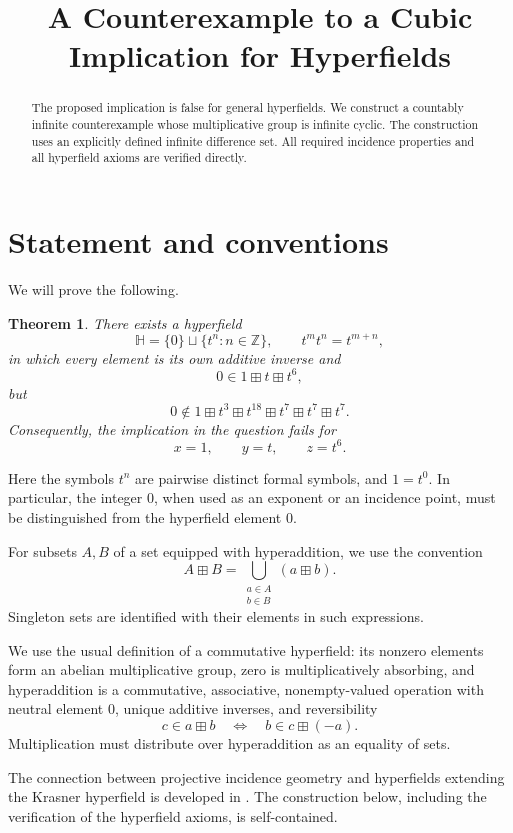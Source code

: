 \documentclass[11pt]{article}
\title{A Counterexample to a Cubic Implication for Hyperfields}
\author{}
\date{}
\newcommand{\ZZ}{\mathbb{Z}}
\newcommand{\HH}{\mathbb{H}}
\newtheorem{theorem}{Theorem}
\begin{document}
\maketitle

\begin{abstract}
The proposed implication is false for general hyperfields. We construct a
countably infinite counterexample whose multiplicative group is infinite
cyclic. The construction uses an explicitly defined infinite difference set.
All required incidence properties and all hyperfield axioms are verified
directly.
\end{abstract}

\section{Statement and conventions}

We will prove the following.

\begin{theorem}\label{thm:main}
There exists a hyperfield
\[
    \HH=\{0\}\sqcup\{t^n:n\in\ZZ\},
    \qquad t^m t^n=t^{m+n},
\]
in which every element is its own additive inverse and
\[
    0\in 1\boxplus t\boxplus t^6,
\]
but
\[
    0\notin
    1\boxplus t^3\boxplus t^{18}
      \boxplus t^7\boxplus t^7\boxplus t^7.
\]
Consequently, the implication in the question fails for
\[
    x=1,\qquad y=t,\qquad z=t^6.
\]
\end{theorem}

Here the symbols \(t^n\) are pairwise distinct formal symbols, and \(1=t^0\).
In particular, the integer \(0\), when used as an exponent or an incidence
point, must be distinguished from the hyperfield element \(0\).

For subsets \(A,B\) of a set equipped with hyperaddition, we use the convention
\[
    A\boxplus B
    =\bigcup_{\substack{a\in A\\ b\in B}}(a\boxplus b).
\]
Singleton sets are identified with their elements in such expressions.

We use the usual definition of a commutative hyperfield: its nonzero elements
form an abelian multiplicative group, zero is multiplicatively absorbing,
and hyperaddition is a commutative, associative, nonempty-valued operation
with neutral element \(0\), unique additive inverses, and reversibility
\[
    c\in a\boxplus b
    \quad\Longleftrightarrow\quad
    b\in c\boxplus(-a).
\]
Multiplication must distribute over hyperaddition as an equality of sets.

The connection between projective incidence geometry and hyperfields
extending the Krasner hyperfield is developed in
\cite[Sections~3--4]{CC}. The construction below, including the verification
of the hyperfield axioms, is self-contained.
\end{document}
